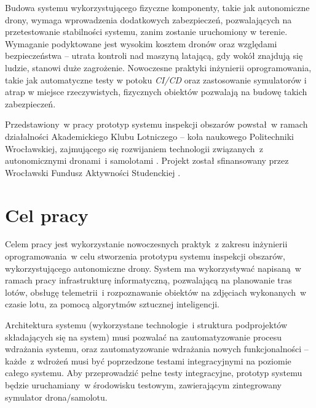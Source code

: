 Budowa systemu wykorzystującego fizyczne komponenty, takie jak autonomiczne drony,
wymaga wprowadzenia dodatkowych zabezpieczeń, pozwalających na przetestowanie stabilności
systemu, zanim zostanie uruchomiony w terenie. Wymaganie podyktowane jest wysokim kosztem
dronów oraz względami bezpieczeństwa -- utrata kontroli nad maszyną latającą, gdy wokół znajdują
się ludzie, stanowi duże zagrożenie. Nowoczesne praktyki inżynierii oprogramowania, takie jak 
automatyczne testy w potoku \textit{CI/CD} oraz zastosowanie symulatorów i atrap
w miejsce rzeczywistych, fizycznych obiektów pozwalają na budowę takich zabezpieczeń.

Przedstawiony~w pracy prototyp systemu inspekcji obszarów powstał~w ramach działalności
Akademickiego Klubu Lotniczego -- koła naukowego Politechniki Wrocławskiej, zajmującego
się rozwijaniem technologii związanych~z autonomicznymi dronami~i samolotami
\cite{akl_home_page}. Projekt został sfinansowany przez Wrocławski Fundusz
Aktywności Studenckiej \cite{fast_webpage}.


\section{Cel pracy} \label{intro_objective}

Celem pracy jest wykorzystanie nowoczesnych praktyk~z zakresu inżynierii 
oprogramowania~w celu stworzenia prototypu systemu inspekcji obszarów,
wykorzystującego autonomiczne drony. System ma wykorzystywać napisaną~w ramach pracy
infrastrukturę informatyczną, pozwalającą na planowanie tras lotów, obsługę telemetrii~i
rozpoznawanie obiektów na zdjęciach wykonanych~w czasie lotu, za pomocą algorytmów
sztucznej inteligencji. 

Architektura systemu (wykorzystane technologie~i struktura podprojektów składających
się na system) musi pozwalać na zautomatyzowanie procesu wdrażania
systemu, oraz zautomatyzowanie wdrażania nowych funkcjonalności -- każde~z wdrożeń musi
być poprzedzone testami integracyjnymi na poziomie całego systemu.
Aby przeprowadzić pełne testy integracyjne, prototyp systemu będzie uruchamiany~w
środowisku testowym, zawierającym zintegrowany symulator drona/samolotu.

